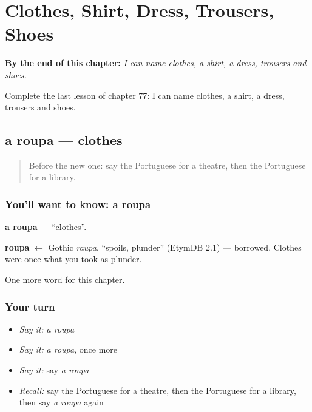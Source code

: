
\chapter{Clothes, Shirt, Dress, Trousers, Shoes}
\label{ch:pt-clothes-shirt-dress-trousers-shoes}

\begin{chapteropening}
\textbf{By the end of this chapter:} \emph{I can name clothes, a shirt, a dress, trousers and shoes.}

Complete the last lesson of chapter 77: I can name clothes, a shirt, a dress, trousers and shoes.
\end{chapteropening}

\section[a roupa]{a roupa — clothes}

\label{lesson:PT-C77-roupa}



\begin{quote}
Before the new one: say the Portuguese for a theatre, then the Portuguese for a library.
\end{quote}

\subsection*{You'll want to know: a roupa}
\textbf{a roupa} — \textquotedblleft{}clothes\textquotedblright{}.

\begin{cousinweb}
\textbf{roupa} $\leftarrow$ Gothic \emph{raupa}, \textquotedblleft{}spoils, plunder\textquotedblright{} (EtymDB 2.1) — borrowed. Clothes were once what you took as plunder.
\end{cousinweb}

\begin{grammarlens}[title={What you've built}]
One more word for this chapter.
\end{grammarlens}

\subsection*{Your turn}
\begin{itemize}
\raggedright
  \item \emph{Say it:} \emph{a roupa}
  \item \emph{Say it:} \emph{a roupa}, once more
  \item \emph{Say it:} say \emph{a roupa}
  \item \emph{Recall:} say the Portuguese for a theatre, then the Portuguese for a library, then say \emph{a roupa} again
\end{itemize}

